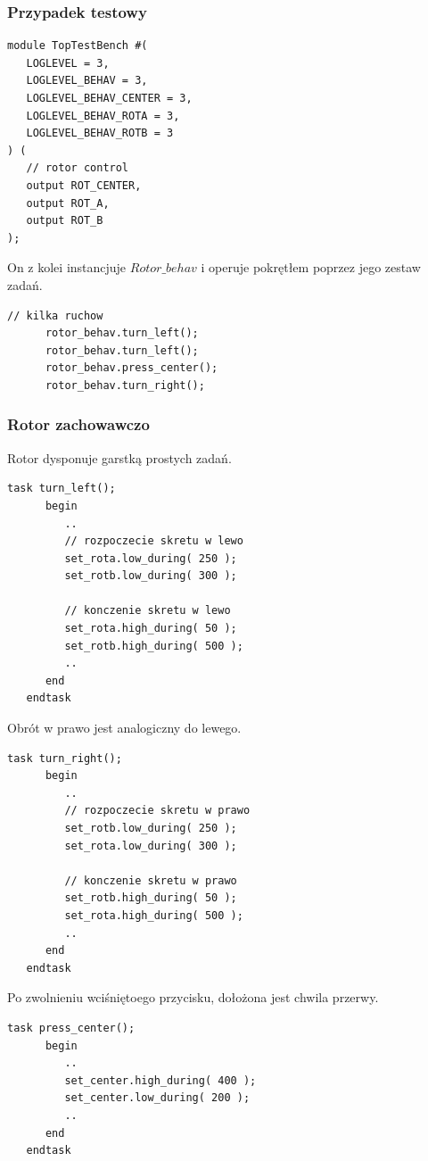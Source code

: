 \documentclass[a4paper,12pt]{article}
\begin{document}
\subsubsection{Przypadek testowy}


\begin{lstlisting}[label=TopTestBench,caption=TopTestBench.v]
module TopTestBench #(
   LOGLEVEL = 3,
   LOGLEVEL_BEHAV = 3,
   LOGLEVEL_BEHAV_CENTER = 3,
   LOGLEVEL_BEHAV_ROTA = 3,
   LOGLEVEL_BEHAV_ROTB = 3
) (
   // rotor control
   output ROT_CENTER,
   output ROT_A,
   output ROT_B
);
\end{lstlisting}
On z kolei instancjuje $Rotor\_behav$ i operuje pokrętłem poprzez jego zestaw zadań.
\begin{lstlisting}[label=TopTestBench,caption=TopTestBench.v,firstnumber=37]
      // kilka ruchow
      rotor_behav.turn_left();
      rotor_behav.turn_left();
      rotor_behav.press_center();
      rotor_behav.turn_right();
\end{lstlisting}

\subsubsection{Rotor zachowawczo}

Rotor dysponuje garstką prostych zadań.
\begin{lstlisting}[label=Rotor_behav,caption=Rotor\_behav.v]
   task turn_left();
      begin
         ..
         // rozpoczecie skretu w lewo
         set_rota.low_during( 250 );
         set_rotb.low_during( 300 );

         // konczenie skretu w lewo
         set_rota.high_during( 50 );
         set_rotb.high_during( 500 );
         ..
      end
   endtask
\end{lstlisting}

Obrót w prawo jest analogiczny do lewego.
\begin{lstlisting}[label=Rotor_behav,caption=Rotor\_behav.v]
   task turn_right();
      begin
         ..
         // rozpoczecie skretu w prawo
         set_rotb.low_during( 250 );
         set_rota.low_during( 300 );

         // konczenie skretu w prawo
         set_rotb.high_during( 50 );
         set_rota.high_during( 500 );
         ..
      end
   endtask
\end{lstlisting}


Po zwolnieniu wciśniętoego przycisku, dołożona jest chwila przerwy.
\begin{lstlisting}[label=Rotor_behav,caption=Rotor\_behav.v]
   task press_center();
      begin
         ..
         set_center.high_during( 400 );
         set_center.low_during( 200 );
         ..
      end
   endtask
\end{lstlisting}
\end{document}

